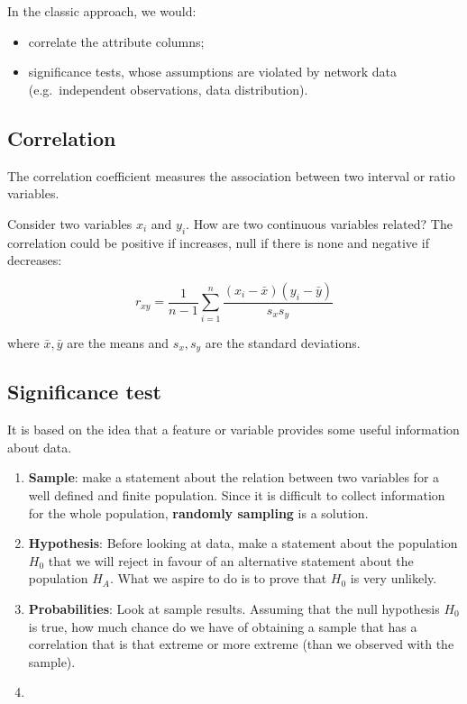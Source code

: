 \documentclass[
  notitlepage,
  onecolumn,
  openany]{book}
\providecommand{\tightlist}{%
  \setlength{\itemsep}{0pt}\setlength{\parskip}{0pt}}
\begin{document}
In the classic approach, we would:

\begin{itemize}
\tightlist
\item
  correlate the attribute columns;
\item
  significance tests, whose assumptions are violated by network data (e.g.~independent observations, data distribution).
\end{itemize}

\hypertarget{correlation}{%
\subsection{Correlation}\label{correlation}}

The correlation coefficient measures the association between two interval or ratio variables.

Consider two variables \(x_i\) and \(y_i\). How are two continuous variables related? The correlation could be positive if increases, null if there is none and negative if decreases:

\[
r_{xy} = \frac{1}{n-1}\sum^n_{i=1} \frac{(x_i-\bar{x})(y_i-\bar{y})}{s_xs_y}
\]

where \(\bar{x}, \bar{y}\) are the means and \(s_x,s_y\) are the standard deviations.

\hypertarget{significance-test}{%
\subsection{Significance test}\label{significance-test}}

It is based on the idea that a feature or variable provides some useful information about data.

\begin{enumerate}
\def\labelenumi{\arabic{enumi}.}
\item
  \textbf{Sample}: make a statement about the relation between two variables for a well defined and finite population. Since it is difficult to collect information for the whole population, \textbf{randomly sampling} is a solution.
\item
  \textbf{Hypothesis}: Before looking at data, make a statement about the population \(H_0\) that we will reject in favour of an alternative statement about the population \(H_A\). What we aspire to do is to prove that \(H_0\) is very unlikely.
\item
  \textbf{Probabilities}: Look at sample results. Assuming that the null hypothesis \(H_0\) is true, how much chance do we have of obtaining a sample that has a correlation that is that extreme or more extreme (than we observed with the sample).
\item
\end{enumerate}
\end{document}
